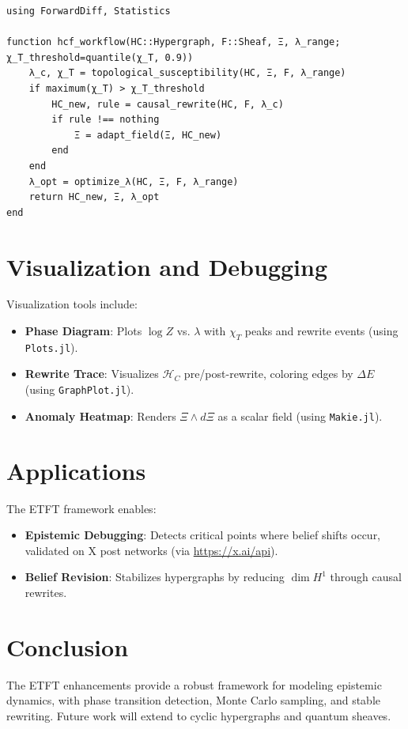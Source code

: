 \documentclass[12pt]{article}
\begin{document}
\begin{verbatim}
using ForwardDiff, Statistics

function hcf_workflow(HC::Hypergraph, F::Sheaf, Ξ, λ_range; χ_T_threshold=quantile(χ_T, 0.9))
    λ_c, χ_T = topological_susceptibility(HC, Ξ, F, λ_range)
    if maximum(χ_T) > χ_T_threshold
        HC_new, rule = causal_rewrite(HC, F, λ_c)
        if rule !== nothing
            Ξ = adapt_field(Ξ, HC_new)
        end
    end
    λ_opt = optimize_λ(HC, Ξ, F, λ_range)
    return HC_new, Ξ, λ_opt
end
\end{verbatim}

\section{Visualization and Debugging}
Visualization tools include:
\begin{itemize}
    \item \textbf{Phase Diagram}: Plots \(\log Z\) vs. \(\lambda\) with \(\chi_T\) peaks and rewrite events (using \texttt{Plots.jl}).
    \item \textbf{Rewrite Trace}: Visualizes \(\mathcal{H}_C\) pre/post-rewrite, coloring edges by \(\Delta E\) (using \texttt{GraphPlot.jl}).
    \item \textbf{Anomaly Heatmap}: Renders \(\Xi \wedge d\Xi\) as a scalar field (using \texttt{Makie.jl}).
\end{itemize}

\section{Applications}
The ETFT framework enables:
\begin{itemize}
    \item \textbf{Epistemic Debugging}: Detects critical points where belief shifts occur, validated on X post networks (via \url{https://x.ai/api}).
    \item \textbf{Belief Revision}: Stabilizes hypergraphs by reducing \(\dim H^1\) through causal rewrites.
\end{itemize}

\section{Conclusion}
The ETFT enhancements provide a robust framework for modeling epistemic dynamics, with phase transition detection, Monte Carlo sampling, and stable rewriting. Future work will extend to cyclic hypergraphs and quantum sheaves.
\end{document}
